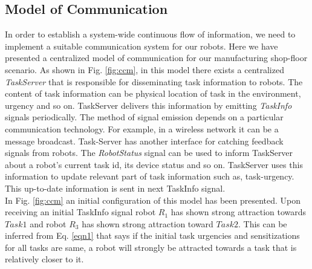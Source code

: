 \documentclass{llncs}
\begin{document}
\subsection{Model of Communication}
In order to establish a system-wide continuous flow of information, we need to implement a suitable communication system for our robots. Here we have presented a centralized model of communication for our manufacturing shop-floor scenario.
As shown in Fig. \ref{fig:ccm}, in this model there exists a centralized \textit{
TaskServer} that is responsible for disseminating task information to robots. The content of task information can be physical location of task in the environment, urgency and so on. TaskServer delivers this information by emitting \textit{TaskInfo} signals periodically. The method of signal emission depends on a particular communication technology. For example, in a wireless network it can be a message broadcast.
Task-Server has another interface for catching feedback signals from robots. The \textit{RobotStatus} signal can be used to inform TaskServer about a robot's current task id, its device status and so on. TaskServer uses this information to update relevant part of task information such as, task-urgency. This up-to-date information is sent in next TaskInfo signal.\\
In Fig. \ref{fig:ccm} an initial configuration of this model has been presented. Upon receiving an initial TaskInfo signal robot $R_1$  has shown strong attraction towards $Task1$ and robot $R_3$ has shown strong attraction toward $Task2$. This can be inferred from Eq. \ref{eqn1} that says if the initial task urgencies and sensitizations for all tasks are same, a robot will strongly be attracted towards a task that is relatively closer to it.
\end{document}

